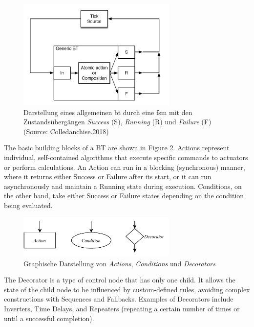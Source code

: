 \begin{figure}[h]
    \centering
    \includegraphics[width=0.7\textwidth]{figures/02_state_of_the_art/fsm_general_bt.png}
    \caption[Allgemeiner \textit{Behavior Tree} als FSM]{Darstellung eines allgemeinen \gls{bt} durch eine \gls{fsm} mit den Zustandsübergängen \textit{Success} (S), \textit{Running} (R) und \textit{Failure} (F) (Source: Colledanchise.2018)}
    \label{fig:fsm_general_bt}
                          \end{figure}

The basic building blocks of a BT are shown in Figure \ref{fig:bt_types}. Actions represent individual, self-contained algorithms that execute specific commands to actuators or perform calculations. An Action can run in a blocking (synchronous) manner, where it returns either Success or Failure after its start, or it can run asynchronously and maintain a Running state during execution. Conditions, on the other hand, take either Success or Failure states depending on the condition being evaluated.

\begin{figure}[h]
    \centering
    \includegraphics[width=0.7\textwidth]{figures/02_state_of_the_art/bt_types.pdf}
    \caption{Graphische Darstellung von \textit{Actions}, \textit{Conditions} und \textit{Decorators}}
    \label{fig:bt_types}
\end{figure}

The Decorator is a type of control node that has only one child. It allows the state of the child node to be influenced by custom-defined rules, avoiding complex constructions with Sequences and Fallbacks. Examples of Decorators include Inverters, Time Delays, and Repeaters (repeating a certain number of times or until a successful completion).

